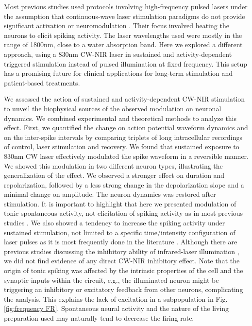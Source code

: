 Most previous studies used protocols involving high-frequency pulsed lasers under the assumption that continuous-wave laser stimulation paradigms do not provide significant activation or neuromodulation \parencite{wells_application_2005, wells_application_2005-1, cayce_infrared_2014, chernov_infrared_2014, goyal_acute_2012, pan_infrared_2023}. Their focus involved heating the neurons to elicit spiking activity. The laser wavelengths used were mostly in the range of 1800nm, close to a water absorption band. Here we explored a different approach, using a 830nm CW-NIR laser in sustained and activity-dependent triggered stimulation instead of pulsed illumination at fixed frequency. This setup has a promising future for clinical applications for long-term stimulation and patient-based treatments.

We assessed the action of sustained and activity-dependent CW-NIR stimulation to unveil the biophysical sources of the observed modulation on neuronal dynamics. We combined experimental and theoretical methods to analyze this effect. First, we quantified the change on action potential waveform dynamics and on the inter-spike intervals by comparing triplets of long intracellular recordings of control, laser stimulation and recovery. We found that sustained exposure to 830nm CW laser effectively modulated the spike waveform in a reversible manner. We showed this modulation in two different neuron types, illustrating the generalization of the effect. We observed a stronger effect on duration and repolarization, followed by a less strong change in the depolarization slope and a minimal change on amplitude. The neuron dynamics was restored after stimulation. It is important to highlight that here we presented modulation of tonic spontaneous activity, not elicitation of spiking activity as in most previous studies \parencite{wells_application_2005,izzo_optical_2007,shapiro_infrared_2012,rabbitt_heat_2016}. We also showed a tendency to increase the spiking activity under sustained stimulation, not limited to a specific time/intensity configuration of laser pulses as it is most frequently done in the literature \parencite{izzo_optical_2007,goyal_acute_2012,beier_plasma_2014,pan_infrared_2023}. Although there are previous studies discussing the inhibitory ability of infrared-laser illumination \parencite{duke_transient_2013,lothet_selective_2017,ganguly_thermal_2019, begeng_activity_2022}, we did not find evidence of any direct CW-NIR inhibitory effect. Note that the origin of tonic spiking was affected by the intrinsic properties of the cell and the synaptic inputs within the circuit, e.g., the illuminated neuron might be triggering an inhibitory or excitatory feedback from other neurons, complicating the analysis. This explains the lack of excitation in a subpopulation in Fig. \ref{fig:frequency FR}. Spontaneous neural activity and the nature of the living preparation used may naturally tend to decrease the firing rate.

